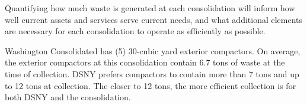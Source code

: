 
    Quantifying how much waste is generated at each consolidation will inform how well current assets and services serve current needs, and what additional elements are necessary for each consolidation to operate as efficiently as possible.
    
    Washington Consolidated has (5) 30-cubic yard exterior compactors. On average, the exterior compactors at this consolidation contain 6.7 tons of waste at the time of collection. DSNY prefers compactors to contain more than 7 tons and up to 12 tons at collection. The closer to 12 tons, the more efficient collection is for both DSNY and the consolidation.